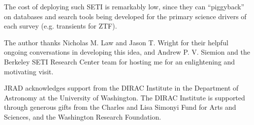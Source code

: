 \documentclass[twocolumn]{aastex62}
\begin{document}
The cost of deploying such SETI is remarkably low, since they can ``piggyback'' on databases and search tools being developed for the primary science drivers of each survey (e.g. transients for ZTF).




\acknowledgments

The author thanks Nicholas M. Law and Jason T. Wright for their helpful ongoing conversations in developing this idea, and Andrew P. V. Siemion and the Berkeley SETI Research Center team for hosting me for an enlightening and motivating visit.

JRAD acknowledges support from the DIRAC Institute in the Department of Astronomy at the University of Washington. The DIRAC Institute is supported through generous gifts from the Charles and Lisa Simonyi Fund for Arts and Sciences, and the Washington Research Foundation.


\end{document}
